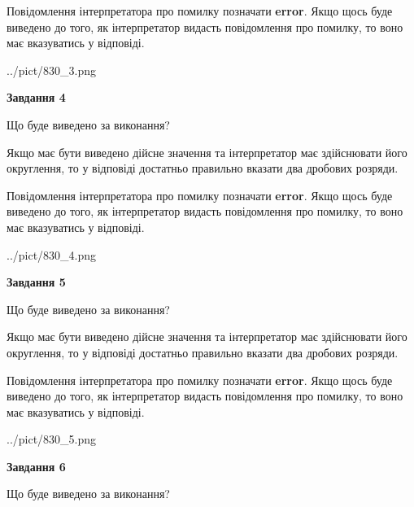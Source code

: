\documentclass[12pt, ukrainian]{article}
\begin{document}
{\begin {Large}
Повідомлення інтерпретатора про помилку позначати \textbf{error}.
Якщо щось буде виведено до того, як інтерпретатор видасть повідомлення про помилку, 
то воно має вказуватись у відповіді. \par

\begin{center}
	{../pict/830_3.png}
\end{center}
\newpage

{\begin {center}\textbf{Завдання 4}\end {center}}\par
Що буде виведено за виконання? \par

Якщо має бути виведено дійсне значення та інтерпретатор має здійснювати його округлення, 
то у відповіді достатньо правильно вказати два дробових розряди.

Повідомлення інтерпретатора про помилку позначати \textbf{error}.
Якщо щось буде виведено до того, як інтерпретатор видасть повідомлення про помилку, 
то воно має вказуватись у відповіді. \par

\begin{center}
	{../pict/830_4.png}
\end{center}
\newpage

{\begin {center}\textbf{Завдання 5}\end {center}}\par
Що буде виведено за виконання? \par

Якщо має бути виведено дійсне значення та інтерпретатор має здійснювати його округлення, 
то у відповіді достатньо правильно вказати два дробових розряди.

Повідомлення інтерпретатора про помилку позначати \textbf{error}.
Якщо щось буде виведено до того, як інтерпретатор видасть повідомлення про помилку, 
то воно має вказуватись у відповіді. \par

\begin{center}
	{../pict/830_5.png}
\end{center}
\newpage

{\begin {center}\textbf{Завдання 6}\end {center}}\par
Що буде виведено за виконання? \par


\end{Large}}
\end{document}
